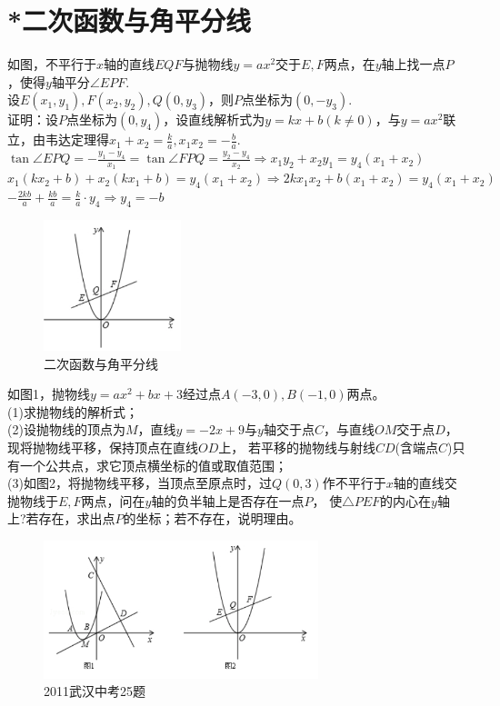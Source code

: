 \documentclass{ecnuthesis}
\begin{document}
\section{*二次函数与角平分线}
\begin{model}
    如图，不平行于$x$轴的直线$EQF$与抛物线$y=ax^2$交于$E,F$两点，在$y$轴上找一点$P$，使得$y$轴平分$\angle EPF$. \\
    设$E(x_1,y_1),F(x_2,y_2),Q(0,y_3)$，则$P$点坐标为$(0,-y_3)$. \\
    证明：设$P$点坐标为$(0,y_4)$，设直线解析式为$y=kx+b(k\ne 0)$，与$y=ax^2$联立，由韦达定理得$x_1+x_2=\frac{k}{a},x_1x_2=-\frac{b}{a}$. \\
    $\tan \angle EPQ = -\frac{y_1-y_4}{x_1} = \tan \angle FPQ = \frac{y_2-y_4}{x_2} \Rightarrow x_1y_2+x_2y_1=y_4(x_1+x_2) $ \\
    $x_1(kx_2+b)+x_2(kx_1+b)=y_4(x_1+x_2) \Rightarrow 2kx_1x_2+b(x_1+x_2)=y_4(x_1+x_2)$ \\
    $-\frac{2kb}{a}+\frac{kb}{a}=\frac{k}{a}·y_4 \Rightarrow y_4=-b$
\end{model}
\begin{figure}[H]
\centering
\includegraphics[width=4cm]{picture/1001.png}
\caption{二次函数与角平分线}
\end{figure}
\begin{problem}
    如图1，抛物线$y=ax^2+bx+3$经过点$A(-3,0),B(-1,0)$两点。\\
    (1)求抛物线的解析式；\\
    (2)设抛物线的顶点为$M$，直线$y=-2x+9$与$y$轴交于点$C$，与直线$OM$交于点$D$，现将抛物线平移，保持顶点在直线$OD$上，
    若平移的抛物线与射线$CD$(含端点$C$)只有一个公共点，求它顶点横坐标的值或取值范围；\\
    (3)如图2，将抛物线平移，当顶点至原点时，过$Q(0,3)$作不平行于$x$轴的直线交抛物线于$E,F$两点，问在$y$轴的负半轴上是否存在一点$P$，
    使$\triangle PEF$的内心在$y$轴上?若存在，求出点$P$的坐标；若不存在，说明理由。
\end{problem}
\begin{figure}[H]
\centering
\includegraphics[width=8cm]{picture/1002.png}
\caption{2011武汉中考25题}
\end{figure}
\clearpage
\end{document}
